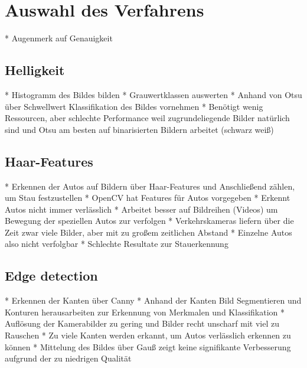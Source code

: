 \section{Auswahl des Verfahrens}
* Augenmerk auf Genauigkeit

\subsection{Helligkeit}
* Histogramm des Bildes bilden\newline
* Grauwertklassen auswerten\newline
* Anhand von Otsu über Schwellwert Klassifikation des Bildes vornehmen\newline
* Benötigt wenig Ressourcen, aber schlechte Performance weil zugrundeliegende Bilder \newline
	natürlich sind und Otsu am besten auf binarisierten Bildern arbeitet (schwarz weiß)
	
\subsection{Haar-Features}
* Erkennen der Autos auf Bildern über Haar-Features und Anschließend zählen, um Stau festzustellen\newline
* OpenCV hat Features für Autos vorgegeben\newline
* Erkennt Autos nicht immer verlässlich\newline
* Arbeitet besser auf Bildreihen (Videos) um Bewegung der speziellen Autos zur verfolgen\newline
* Verkehrskameras liefern über die Zeit zwar viele Bilder, aber mit zu großem zeitlichen Abstand\newline
* Einzelne Autos also nicht verfolgbar\newline
* Schlechte Resultate zur Stauerkennung\newline

\subsection{Edge detection}
* Erkennen der Kanten über Canny\newline
* Anhand der Kanten Bild Segmentieren und Konturen herausarbeiten zur Erkennung von Merkmalen und Klassifikation\newline
* Auflösung der Kamerabilder zu gering und Bilder recht unscharf mit viel zu Rauschen\newline
* Zu viele Kanten werden erkannt, um Autos verlässlich erkennen zu können\newline
* Mittelung des Bildes über Gauß zeigt keine signifikante Verbesserung aufgrund der zu niedrigen Qualität\newline
	
